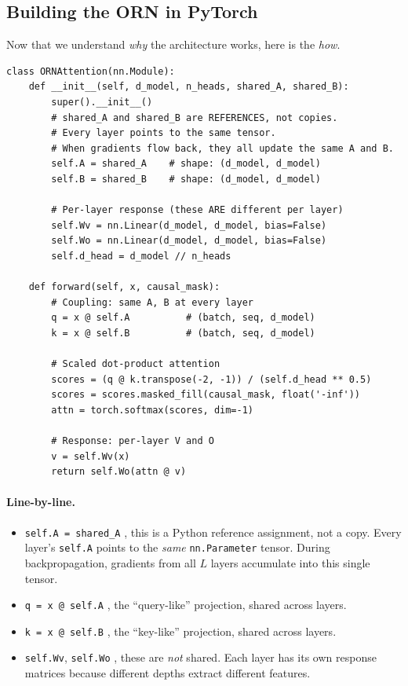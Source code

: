 \documentclass[11pt, a4paper]{article}
\theoremstyle{remark}
\begin{document}
\subsection{Building the ORN in PyTorch}
\label{sec:grn:pytorch}

Now that we understand \emph{why} the architecture works, here is the \emph{how}.

\begin{lstlisting}[caption={ORN attention layer: shared coupling, per-layer response}]
class ORNAttention(nn.Module):
    def __init__(self, d_model, n_heads, shared_A, shared_B):
        super().__init__()
        # shared_A and shared_B are REFERENCES, not copies.
        # Every layer points to the same tensor.
        # When gradients flow back, they all update the same A and B.
        self.A = shared_A    # shape: (d_model, d_model)
        self.B = shared_B    # shape: (d_model, d_model)

        # Per-layer response (these ARE different per layer)
        self.Wv = nn.Linear(d_model, d_model, bias=False)
        self.Wo = nn.Linear(d_model, d_model, bias=False)
        self.d_head = d_model // n_heads

    def forward(self, x, causal_mask):
        # Coupling: same A, B at every layer
        q = x @ self.A          # (batch, seq, d_model)
        k = x @ self.B          # (batch, seq, d_model)

        # Scaled dot-product attention
        scores = (q @ k.transpose(-2, -1)) / (self.d_head ** 0.5)
        scores = scores.masked_fill(causal_mask, float('-inf'))
        attn = torch.softmax(scores, dim=-1)

        # Response: per-layer V and O
        v = self.Wv(x)
        return self.Wo(attn @ v)
\end{lstlisting}

\paragraph{Line-by-line.}
\begin{itemize}[nosep]
    \item \texttt{self.A = shared\_A} ,  this is a Python reference assignment, not a copy.
    Every layer's \texttt{self.A} points to the \emph{same} \texttt{nn.Parameter} tensor.
    During backpropagation, gradients from all $L$ layers accumulate into this single tensor.
    \item \texttt{q = x @ self.A} ,  the ``query-like'' projection, shared across layers.
    \item \texttt{k = x @ self.B} ,  the ``key-like'' projection, shared across layers.
    \item \texttt{self.Wv}, \texttt{self.Wo} ,  these are \emph{not} shared.
    Each layer has its own response matrices because different depths extract different features.
\end{itemize}
\end{document}
